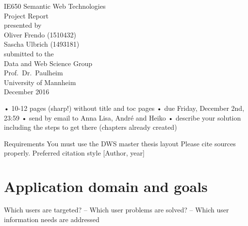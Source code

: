 \documentclass[11pt,titlepage,oneside,openany]{article}
\begin{document}
\begin{titlepage}
	\vspace*{2cm}
  \begin{center}
   {\Large IE650 Semantic Web Technologies\\}
   \vspace{2cm} 
   {Project Report\\}
   \vspace{2cm}
   {presented by\\
    Oliver Frendo (1510432) \\
    Sascha Ulbrich (1493181) \\
   }
   \vspace{1cm} 
   {submitted to the\\
    Data and Web Science Group\\
    Prof.\ Dr.\ Paulheim\\
    University of Mannheim\\} \vspace{2cm}
   {December 2016}
  \end{center}
\end{titlepage} 

\tableofcontents
\newpage





\newpage



• 10-12 pages (sharp!) without title and toc pages 
• due Friday, December 2nd, 23:59 
• send by email to Anna Lisa, André and Heiko 
• describe your solution including the steps to get there (chapters already created)

Requirements 
You must use the DWS master thesis layout
Please cite sources properly. Preferred citation style [Author, year]



\section{Application domain and goals}
Which users are targeted? – Which user problems are solved? – Which user information needs are addressed
\end{document}
